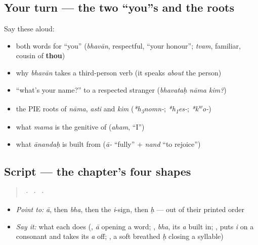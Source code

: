 \subsection*{Your turn — the two \textquotedblleft{}you\textquotedblright{}s and the roots}
Say these aloud:

\begin{itemize}
\raggedright
  \item both words for \textquotedblleft{}you\textquotedblright{} (\emph{bhavān}, respectful, \textquotedblleft{}your honour\textquotedblright{}; \emph{tvam}, familiar, cousin of \textbf{thou})
  \item why \emph{bhavān} takes a third-person verb (it speaks \emph{about} the person)
  \item \textquotedblleft{}what's your name?\textquotedblright{} to a respected stranger (\emph{bhavataḥ nāma kim?})
  \item the PIE roots of \emph{nāma}, \emph{asti} and \emph{kim} (\emph{*h\textsubscript{3}nomn-}; \emph{*h\textsubscript{1}es-}; \emph{*k\textsuperscript{w}o-})
  \item what \emph{mama} is the genitive of (\emph{aham}, \textquotedblleft{}I\textquotedblright{})
  \item what \emph{ānandaḥ} is built from (\emph{ā-} \textquotedblleft{}fully\textquotedblright{} + \emph{nand} \textquotedblleft{}to rejoice\textquotedblright{})
\end{itemize}

\subsection*{Script — the chapter's four shapes}
\begin{quote}
 ·  ·  · 
\end{quote}

\begin{itemize}
\raggedright
  \item \emph{Point to:} \emph{ā}, then \emph{bha}, then the \emph{i}-sign, then \emph{ḥ} — out of their printed order
  \item \emph{Say it:} what each does (\textbf{}, \emph{ā} opening a word; \textbf{}, \emph{bha}, its \emph{a} built in; \textbf{}, puts \emph{i} on a consonant and takes its \emph{a} off; \textbf{}, a soft breathed \emph{ḥ} closing a syllable)
\end{itemize}

